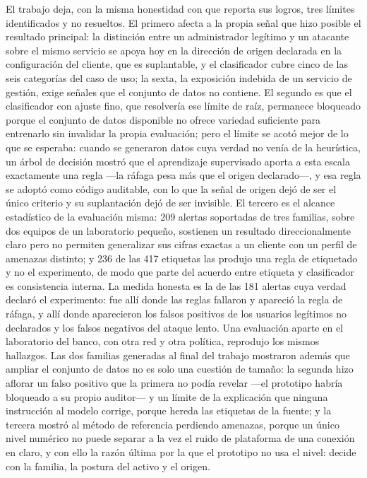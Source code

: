El trabajo deja, con la misma honestidad con que reporta sus logros, tres límites identificados y no
resueltos. El primero afecta a la propia señal que hizo posible el resultado principal: la
distinción entre un administrador legítimo y un atacante sobre el mismo servicio se apoya hoy en la
dirección de origen declarada en la configuración del cliente, que es suplantable, y el clasificador
cubre cinco de las seis categorías del caso de uso; la sexta, la exposición indebida de un servicio
de gestión, exige señales que el conjunto de datos no contiene. El segundo es que el clasificador con ajuste fino, que resolvería ese límite de raíz,
permanece bloqueado porque el conjunto de datos disponible no ofrece variedad suficiente para
entrenarlo sin invalidar la propia evaluación; pero el límite se acotó mejor de lo que se
esperaba: cuando se generaron datos cuya verdad no venía de la heurística, un árbol de decisión
mostró que el aprendizaje supervisado aporta a esta escala exactamente una regla ---la ráfaga
pesa más que el origen declarado---, y esa regla se adoptó como código auditable, con lo que la
señal de origen dejó de ser el único criterio y su suplantación dejó de ser invisible. El tercero
es el alcance estadístico de la evaluación misma: 209 alertas soportadas de tres familias, sobre
dos equipos de un laboratorio pequeño, sostienen un resultado direccionalmente claro pero no
permiten generalizar sus cifras exactas a un cliente con un perfil de amenazas distinto; y 236 de
las 417 etiquetas las produjo una regla de etiquetado y no el experimento, de modo que parte del
acuerdo entre etiqueta y clasificador es consistencia interna. La medida honesta es la de las 181
alertas cuya verdad declaró el experimento: fue allí donde las reglas fallaron y apareció la regla
de ráfaga, y allí donde aparecieron los falsos positivos de los usuarios legítimos no declarados y
los falsos negativos del ataque lento. Una evaluación aparte en el laboratorio del banco, con otra
red y otra política, reprodujo los mismos hallazgos. Las dos familias
generadas al final del trabajo mostraron además que ampliar el conjunto de datos no es solo una
cuestión de tamaño: la segunda hizo aflorar un falso positivo que la primera no podía revelar
---el prototipo habría bloqueado a su propio auditor--- y un límite de la explicación que ninguna
instrucción al modelo corrige, porque hereda las etiquetas de la fuente; y la tercera mostró al
método de referencia perdiendo amenazas, porque un único nivel numérico no puede separar a la vez
el ruido de plataforma de una conexión en claro, y con ello la razón última por la que el
prototipo no usa el nivel: decide con la familia, la postura del activo y el origen.

